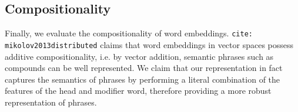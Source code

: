 \documentclass[11pt]{book}
\newcommand{\citet}[1]{\texttt{cite: #1}}
\begin{document}
% 
\subsection{Compositionality}
\label{ssec: entailment}

Finally, we evaluate the compositionality of word embeddings.
\citet{mikolov2013distributed} claims that word embeddings in vector spaces
possess additive compositionality, i.e. by vector addition, semantic phrases
such as compounds can be well represented. We claim that our representation in
fact captures the semantics of phrases by performing a literal combination of
the features of the head and modifier word, therefore providing a more robust
representation of phrases.
\end{document}
